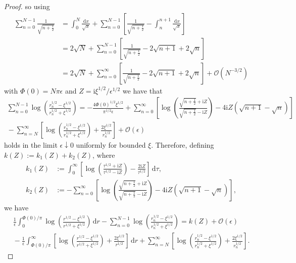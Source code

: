 \documentclass[12pt]{amsart}
\numberwithin{equation}{section}
\newcommand{\dd}{\mathrm{d}}
\newcommand{\ii}{\mathrm{i}}
\newcommand{\phaseint}{\Phi}
\newcommand{\rr}{r}
\newcommand{\bigo}[1]{ \mathcal{O}\! \left( #1 \right) }
\begin{document}
\begin{proof}
so using
\begin{equation}
\begin{split}
\sum_{n=0}^{N-1}\frac{1}{\sqrt{n+\tfrac{1}{2}}}&=\int_0^N\frac{\dd x}{\sqrt{x}}+
\sum_{n=0}^{N-1}\left[\frac{1}{\sqrt{n+\tfrac{1}{2}}}-\int_n^{n+1}\frac{\dd x}{\sqrt{x}}\right]\\
&=2\sqrt{N}+\sum_{n=0}^{N-1}\left[\frac{1}{\sqrt{n+\tfrac{1}{2}}}-2\sqrt{n+1}+2\sqrt{n}\right]\\
&=2\sqrt{N} + \sum_{n=0}^\infty\left[\frac{1}{\sqrt{n+\tfrac{1}{2}}}-2\sqrt{n+1}+2\sqrt{n}\right] +
\bigo{N^{-3/2}}
\end{split}
\end{equation}
with $\phaseint(0)=N\pi\epsilon$ and $Z=\ii\xi^{1/2}/\epsilon^{1/2}$ we have that
\begin{multline}
\sum_{n=0}^{N-1}\log\left(\frac{\rr_n^{1/2}-\xi^{1/2}}{\rr_n^{1/2}+\xi^{1/2}}\right)=-\frac{4\phaseint(0)^{1/2}\xi^{1/2}}{\pi^{1/2}\epsilon} +
\sum_{n=0}^\infty\left[\log\left(\frac{\sqrt{n+\tfrac{1}{2}}+\ii Z}{\sqrt{n+\tfrac{1}{2}}-\ii Z}\right)-4\ii Z(\sqrt{n+1}-\sqrt{n})\right]\\
{}- \sum_{n=N}^\infty
\left[\log\left(\frac{\rr_n^{1/2}-\xi^{1/2}}{\rr_n^{1/2}+\xi^{1/2}}\right)+\frac{2\xi^{1/2}}{\rr_n^{1/2}}\right]+\bigo{\epsilon}
\end{multline}
holds in the limit $\epsilon\downarrow 0$ uniformly for bounded $\xi$.  Therefore, defining $k(Z):=k_1(Z)+k_2(Z)$, where
\begin{equation}
\begin{split}
k_1(Z)&:=\int_0^\infty\left[\log\left(\frac{\tau^{1/2}+\ii Z}{\tau^{1/2}-\ii Z}\right)-\frac{2\ii Z}{\tau^{1/2}}\right]\,\dd\tau, \\
k_2(Z)&:=- 
\sum_{n=0}^\infty\left[\log\left(\frac{\sqrt{n+\tfrac{1}{2}}+\ii Z}{\sqrt{n+\tfrac{1}{2}}-\ii Z}\right)-4\ii Z(\sqrt{n+1}-\sqrt{n})\right],
\end{split}
\label{eq:k1k2}
\end{equation}
we have 
\begin{multline}
\frac{1}{\epsilon}\int_0^{\phaseint(0)/\pi}\log\left(\frac{\rr^{1/2}-\xi^{1/2}}{\rr^{1/2}+\xi^{1/2}}\right)\,\dd \rr-\sum_{n=0}^{N-1}\log\left(\frac{\rr_n^{1/2}-\xi^{1/2}}{\rr_n^{1/2}+\xi^{1/2}}\right)=k(Z)+\bigo{\epsilon}\\
{}- \frac{1}{\epsilon}\int_{\phaseint(0)/\pi}^\infty\left[\log\left(\frac{\rr^{1/2}-\xi^{1/2}}{\rr^{1/2}+\xi^{1/2}}\right)+\frac{2\xi^{1/2}}{\rr^{1/2}}\right]\,\dd \rr +
\sum_{n=N}^\infty\left[\log\left(\frac{\rr_n^{1/2}-\xi^{1/2}}{\rr_n^{1/2}+\xi^{1/2}}\right)+\frac{2\xi^{1/2}}{\rr_n^{1/2}}\right].

\end{multline}
\end{proof}
\end{document}
